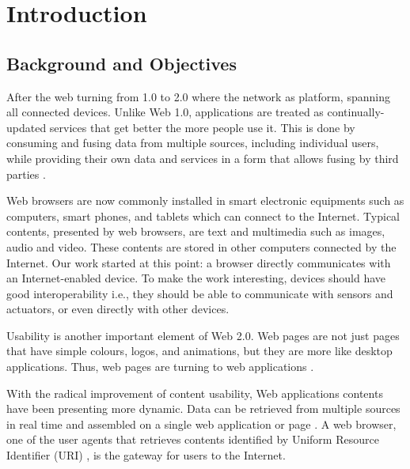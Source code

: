 \chapter{Introduction}
\label{chapter:intro}

\section{Background and Objectives}
After the web turning from 1.0 to 2.0 where the network as platform, spanning all connected devices. Unlike Web 1.0, applications are treated as continually-updated services that get better the more people use it. This is done by consuming and fusing data from multiple sources, including individual users, while providing their own data and services in a form that allows fusing by third parties \cite{o2005web}.

Web browsers are now commonly installed in smart electronic equipments such as computers, smart phones, and tablets which can connect to the Internet. Typical contents, presented by web browsers, are text and multimedia such as images, audio and video. These contents are stored in other computers connected by the Internet. Our work started at this point: a browser directly communicates with an Internet-enabled device. To make the work interesting, devices should have good interoperability i.e., they should be able to communicate with sensors and actuators, or even directly with other devices.

Usability is another important element of Web 2.0. Web pages are not just pages that have simple colours, logos, and animations, but they are more like desktop applications. Thus, web pages are turning to web applications \cite{Lewis:2006:WEB:1217666.1217669}.

With the radical improvement of content usability, Web applications contents have been presenting more dynamic. Data can be retrieved from multiple sources in real time and assembled on a single web application or page \cite{Lewis:2006:WEB:1217666.1217669}. A web browser, one of the user agents that retrieves contents identified by Uniform Resource Identifier (URI) \cite{ArchitectWorldWideWebVolumeOne}, is the gateway for users to the Internet.

